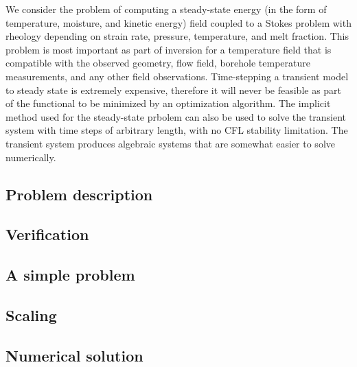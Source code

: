 We consider the problem of computing a steady-state energy (in the form of temperature, moisture, and kinetic energy) field coupled to a Stokes problem with rheology depending on strain rate, pressure, temperature, and melt fraction.
This problem is most important as part of inversion for a temperature field that is compatible with the observed geometry, flow field, borehole temperature measurements, and any other field observations.
Time-stepping a transient model to steady state is extremely expensive, therefore it will never be feasible as part of the functional to be minimized by an optimization algorithm.
The implicit method used for the steady-state prbolem can also be used to solve the transient system with time steps of arbitrary length, with no CFL stability limitation.
The transient system produces algebraic systems that are somewhat easier to solve numerically.

\subsection{Problem description}\label{ssec:vhtproblem}


\subsection{Verification}\label{ssec:vhtverif}


\subsection{A simple problem}\label{sec:vhtsimple}


\subsection{Scaling}\label{sec:vhtscaling}


\subsection{Numerical solution}\label{sec:vhtsolution}

